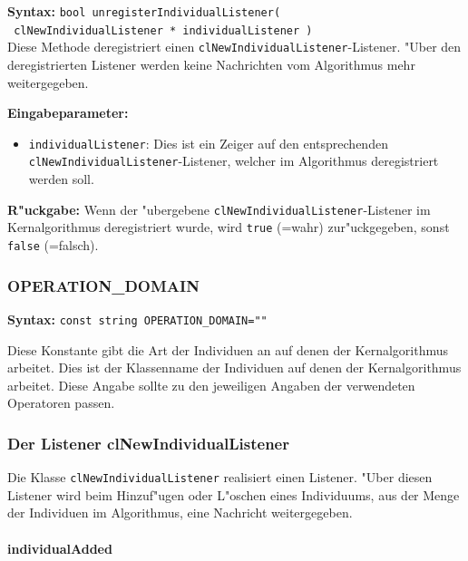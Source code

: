 \textbf{Syntax:} \verb|bool unregisterIndividualListener(| \\\verb| clNewIndividualListener * individualListener )| \\

Diese Methode deregistriert einen \verb|clNewIndividualListener|-Listener. "Uber den deregistrierten Listener werden keine Nachrichten vom Algorithmus mehr weitergegeben.

\bigskip\noindent
\textbf{Eingabeparameter:}
\begin{itemize}
 \item \verb|individualListener|: Dies ist ein Zeiger auf den entsprechenden \verb|clNewIndividualListener|-Listener, welcher im Algorithmus deregistriert werden soll.
\end{itemize}

\bigskip\noindent
\textbf{R"uckgabe:} Wenn der "ubergebene \verb|clNewIndividualListener|-Listener im Kernalgorithmus deregistriert wurde, wird \verb|true| (=wahr) zur"uckgegeben, sonst \verb|false| (=falsch).


\subsubsection{OPERATION\_DOMAIN}

\textbf{Syntax:} \verb|const string OPERATION_DOMAIN=""|

Diese Konstante gibt die Art der Individuen an auf denen der Kernalgorithmus arbeitet. Dies ist der Klassenname der Individuen auf denen der Kernalgorithmus arbeitet. Diese Angabe sollte zu den jeweiligen Angaben der verwendeten Operatoren passen.


\subsubsection{Der Listener clNewIndividualListener}

Die Klasse \verb|clNewIndividualListener| realisiert einen Listener. "Uber diesen Listener wird beim Hinzuf"ugen oder L"oschen eines Individuums, aus der Menge der Individuen im Algorithmus, eine Nachricht weitergegeben.


\paragraph{individualAdded}

